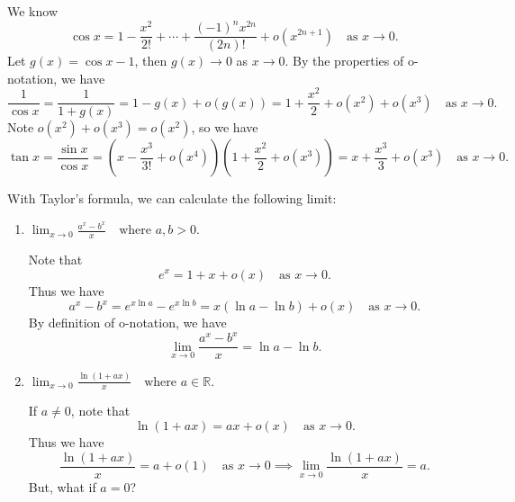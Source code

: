\documentclass[a4paper]{ctexart}
\begin{document}
        \begin{myex}
            We know 
            \[
            \cos x = 1 - \frac{x^2}{2!} + \cdots + \frac{(-1)^n x^{2n}}{(2n)!} + o(x^{2n+1}) \quad \text{as } x\to 0.
            \]
                Let $g(x) = \cos x -1$, then $g(x)\to 0$ as $x\to 0$. By the properties of o-notation, we have
                \[
                \frac{1}{\cos x} = \frac{1}{1 + g(x)} = 1 - g(x) + o(g(x)) = 1 +\frac{x^2}{2} + o(x^2) + o(x^3) \quad \text{as } x\to 0.
                \]
            Note $o(x^2)+o(x^3)=o(x^2)$, so we have
            \[
            \tan x = \frac{\sin x}{\cos x} = \left( x - \frac{x^3}{3!} + o(x^4) \right) \left( 1 + \frac{x^2}{2} + o(x^3) \right) = x + \frac{x^3}{3} + o(x^3) \quad \text{as } x\to 0.
            \]
        \end{myex}
        \begin{myex}
            With Taylor's formula, we can calculate the following limit:
            \begin{enumerate}
                \item \(\displaystyle
            \lim_{x\to 0} \frac{a^x - b^x}{x} \quad \text{where } a,b>0.
            \)

            Note that
            \[
            e^x = 1 + x + o(x) \quad \text{as } x\to 0.
            \]
            Thus we have
            \[
            a^x - b^x = e^{x\ln a} - e^{x\ln b} = x(\ln a - \ln b) + o(x) \quad \text{as } x\to 0.
            \]
            By definition of o-notation, we have
            \[
            \lim_{x\to 0} \frac{a^x - b^x}{x} = \ln a - \ln b.
            \]
                \item \(\displaystyle
            \lim_{x\to 0} \frac{\ln(1+ax)}{x} \quad \text{where } a\in \mathbb{R}.
            \)

            If $a\neq 0$, note that
            \[
            \ln(1+ax) = ax + o(x) \quad \text{as } x\to 0.
            \]
            Thus we have
            \[
            \frac{\ln(1+ax)}{x} = a + o(1) \quad \text{as } x\to 0 \implies \lim_{x\to 0} \frac{\ln(1+ax)}{x} = a.
            \]
            But, what if $a=0$? 
            \end{enumerate}
        \end{myex}
\end{document}
